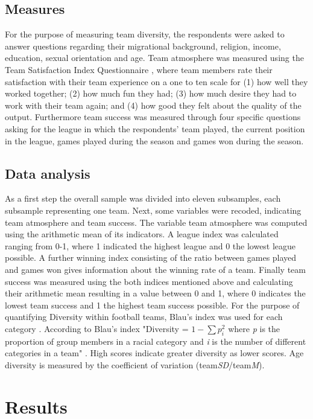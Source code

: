 \documentclass[	
	12pt, %
	a4paper, %
]{scrartcl}\usepackage[]{graphicx}\usepackage[]{color}
\begin{document}
\subsection{Measures} 
For the purpose of measuring team diversity, the respondents were asked to answer questions regarding their migrational background, religion, income, education, sexual orientation and age. Team atmosphere was measured using the Team Satisfaction Index Questionnaire \cite{Basadur2001}, where team members rate their satisfaction with their team experience on a one to ten scale for (1) how well they worked 
together; (2) how much fun they had; (3) how much desire they had to work with their team 
again; and (4) how good they felt about the quality of the output. Furthermore team success was measured through four specific questions asking for the league in which the respondents' team played, the current position in the league, games played during the season and games won during the season.

\subsection{Data analysis}
As a first step the overall sample was divided into eleven subsamples, each subsample representing one team. Next, some variables were recoded, indicating team atmosphere and team success. The variable team atmosphere was computed using the arithmetic mean of its indicators. A league index was calculated ranging from 0-1, where 1 indicated the highest league and 0 the lowest league possible. A further winning index consisting of the ratio between games played and games won gives information about the winning rate of a team. Finally team success was measured using the both indices mentioned above and calculating their arithmetic mean resulting in a value between 0 and 1, where 0 indicates the lowest team success and 1 the highest team success possible. For the purpose of quantifying Diversity within football teams, Blau's index was used for each category \cite{Blau1977}. According to Blau's index "Diversity = $ 1 - \sum p_i^{2} $ where \textit{p} is the proportion of group members in a racial category and \textit{i} is the number of different categories in a team" \cite[p.~599]{Timmerman2000}. High scores indicate greater diversity as lower scores. Age diversity is measured by the coefficient of variation (team\textit{SD}/team\textit{M}).




\section{Results}
\label{sec:results}
\end{document}
